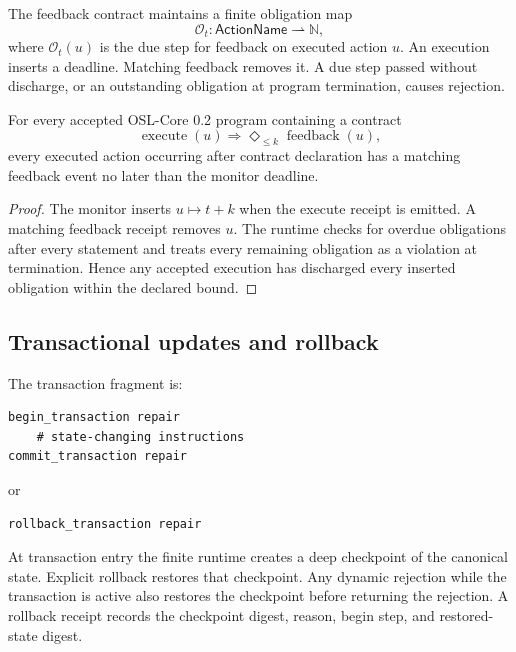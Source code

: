 The feedback contract maintains a finite obligation map
\[
  \mathcal O_t:\mathsf{ActionName}\rightharpoonup\mathbb N,
\]
where $\mathcal O_t(u)$ is the due step for feedback on executed action $u$.
An execution inserts a deadline.  Matching feedback removes it.  A due step
passed without discharge, or an outstanding obligation at program termination,
causes rejection.

\begin{theorem}
For every accepted OSL-Core 0.2 program containing a contract
\[
  \operatorname{execute}(u)
  \Rightarrow
  \Diamond_{\leq k}\operatorname{feedback}(u),
\]
every executed action occurring after contract declaration has a matching
feedback event no later than the monitor deadline.
\end{theorem}

\begin{proof}
The monitor inserts $u\mapsto t+k$ when the execute receipt is emitted.  A
matching feedback receipt removes $u$.  The runtime checks for overdue
obligations after every statement and treats every remaining obligation as a
violation at termination.  Hence any accepted execution has discharged every
inserted obligation within the declared bound.
\end{proof}



\subsection{Transactional updates and rollback}

The transaction fragment is:
\begin{lstlisting}[style=osl]
begin_transaction repair
    # state-changing instructions
commit_transaction repair
\end{lstlisting}
or
\begin{lstlisting}[style=osl]
rollback_transaction repair
\end{lstlisting}

At transaction entry the finite runtime creates a deep checkpoint of the
canonical state.  Explicit rollback restores that checkpoint.  Any dynamic
rejection while the transaction is active also restores the checkpoint before
returning the rejection.  A rollback receipt records the checkpoint digest,
reason, begin step, and restored-state digest.

